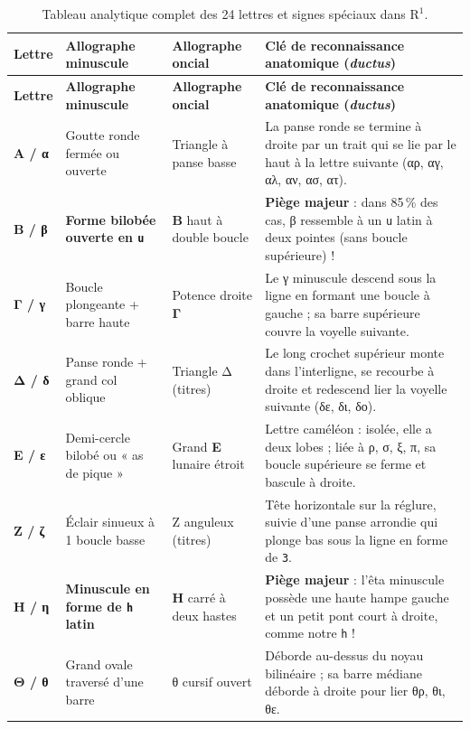 \documentclass[11pt,a4paper]{article}
\begin{document}
\begin{longtable}{@{}p{1.6cm}p{3.8cm}p{3.4cm}p{7.2cm}@{}}
\caption{Tableau analytique complet des 24 lettres et signes spéciaux dans $\text{R}^1$.}\\
\toprule
\textbf{Lettre} & \textbf{Allographe minuscule} & \textbf{Allographe oncial} & \textbf{Clé de reconnaissance anatomique (\textit{ductus})} \\
\midrule
\endfirsthead
\toprule
\textbf{Lettre} & \textbf{Allographe minuscule} & \textbf{Allographe oncial} & \textbf{Clé de reconnaissance anatomique (\textit{ductus})} \\
\midrule
\endhead
\bottomrule
\endfoot
\textbf{Α / α} & Goutte ronde fermée ou ouverte & Triangle à panse basse & La panse ronde se termine à droite par un trait qui se lie par le haut à la lettre suivante (αρ, αγ, αλ, αν, ασ, ατ). \\
\addlinespace
\textbf{Β / β} & \textbf{Forme bilobée ouverte en \texttt{u}} & \textbf{Β} haut à double boucle & \textbf{Piège majeur} : dans 85\,\% des cas, β ressemble à un \texttt{u} latin à deux pointes (sans boucle supérieure) ! \\
\addlinespace
\textbf{Γ / γ} & Boucle plongeante + barre haute & Potence droite \textbf{Γ} & Le γ minuscule descend sous la ligne en formant une boucle à gauche ; sa barre supérieure couvre la voyelle suivante. \\
\addlinespace
\textbf{Δ / δ} & Panse ronde + grand col oblique & Triangle Δ (titres) & Le long crochet supérieur monte dans l'interligne, se recourbe à droite et redescend lier la voyelle suivante (δε, δι, δο). \\
\addlinespace
\textbf{Ε / ε} & Demi-cercle bilobé ou « as de pique » & Grand \textbf{Ε} lunaire étroit & Lettre caméléon : isolée, elle a deux lobes ; liée à ρ, σ, ξ, π, sa boucle supérieure se ferme et bascule à droite. \\
\addlinespace
\textbf{Ζ / ζ} & Éclair sinueux à 1 boucle basse & Ζ anguleux (titres) & Tête horizontale sur la réglure, suivie d'une panse arrondie qui plonge bas sous la ligne en forme de \texttt{3}. \\
\addlinespace
\textbf{Η / η} & \textbf{Minuscule en forme de \texttt{h} latin} & \textbf{Η} carré à deux hastes & \textbf{Piège majeur} : l'êta minuscule possède une haute hampe gauche et un petit pont court à droite, comme notre \texttt{h} ! \\
\addlinespace
\textbf{Θ / θ} & Grand ovale traversé d'une barre & θ cursif ouvert & Déborde au-dessus du noyau bilinéaire ; sa barre médiane déborde à droite pour lier θρ, θι, θε. \\

\end{longtable}
\end{document}
